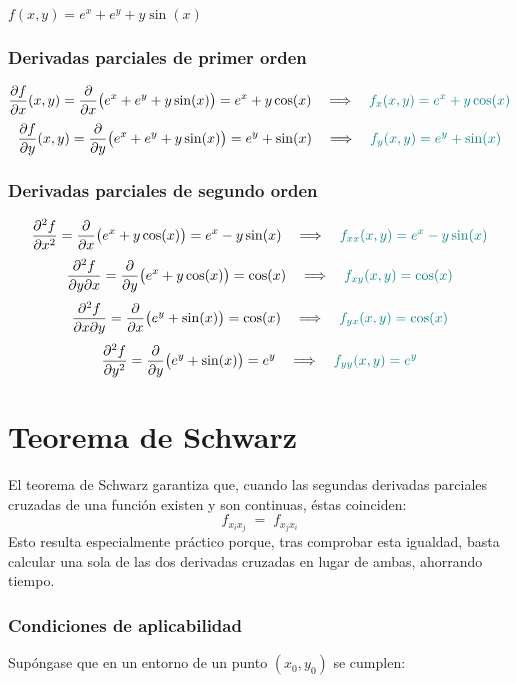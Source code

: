 \documentclass{article}
\begin{document}
\(f(x,y)=e^{x} + e^{y} + y\sin(x)\)


\subsubsection*{Derivadas parciales de primer orden}
\[
\frac{\partial f}{\partial x}(x,y)
=\frac{\partial}{\partial x}\bigl(e^{x} + e^{y} + y\sin(x)\bigr)
=e^{x} + y\cos(x)
\quad\Longrightarrow\quad
\color{teal}
f_{x}(x,y)=e^{x}+y\cos(x)
\]
\[
\frac{\partial f}{\partial y}(x,y)
=\frac{\partial}{\partial y}\bigl(e^{x} + e^{y} + y\sin(x)\bigr)
=e^{y} + \sin(x)
\quad\Longrightarrow\quad
\color{teal}
f_{y}(x,y)=e^{y}+\sin(x)
\]

\subsubsection*{Derivadas parciales de segundo orden}
\[
\frac{\partial^{2}f}{\partial x^{2}}
=\frac{\partial}{\partial x}\bigl(e^{x}+y\cos(x)\bigr)
=e^{x} - y\sin(x)
\quad\Longrightarrow\quad
\color{teal}
f_{xx}(x,y)=e^{x}-y\sin(x)
\]
\[
\frac{\partial^{2}f}{\partial y\partial x}
=\frac{\partial}{\partial y}\bigl(e^{x}+y\cos(x)\bigr)
=\cos(x)
\quad\Longrightarrow\quad
\color{teal}
f_{xy}(x,y)=\cos(x)
\]
\[
\frac{\partial^{2}f}{\partial x\partial y}
=\frac{\partial}{\partial x}\bigl(e^{y}+\sin(x)\bigr)
=\cos(x)
\quad\Longrightarrow\quad
\color{teal}
f_{yx}(x,y)=\cos(x)
\]
\[
\frac{\partial^{2}f}{\partial y^{2}}
=\frac{\partial}{\partial y}\bigl(e^{y}+\sin(x)\bigr)
=e^{y}
\quad\Longrightarrow\quad
\color{teal}
f_{yy}(x,y)=e^{y}
\]




\section*{Teorema de Schwarz}

El teorema de Schwarz garantiza que, cuando las segundas derivadas parciales cruzadas de una función existen y son continuas, éstas coinciden:
\[
f_{x_{i}x_{j}} \;=\; f_{x_{j}x_{i}}
\]
Esto resulta especialmente práctico porque, tras comprobar esta igualdad, basta calcular una sola de las dos derivadas cruzadas en lugar de ambas, ahorrando tiempo.

\subsubsection*{Condiciones de aplicabilidad}

Supóngase que en un entorno de un punto \((x_{0},y_{0})\) se cumplen:
\end{document}
